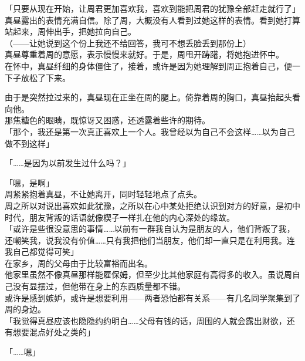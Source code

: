 「只要从现在开始，让周君更加喜欢我，喜欢到能把周君的犹豫全部赶走就行了」\\

真昼露出的表情充满自信。除了周，大概没有人看到过她这样的表情。看到她打算站起来，周伸出手，把她拉向自己。\\

（——让她说到这个份上我还不给回答，我可不想丢脸丢到那份上）\\

真昼尊重着周的意愿，表示慢慢来就好。于是，周甩开踌躇，将她抱进怀中。\\

在怀中，真昼纤细的身体僵住了，接着，或许是因为她理解到周正抱着自己，便一下子放松了下来。

由于是突然拉过来的，真昼现在正坐在周的腿上。倚靠着周的胸口，真昼抬起头看向他。\\

那焦糖色的眼睛，既惊讶又困惑，还透露着些许的期待。\\

「那个，我还是第一次真正喜欢上一个人。我曾经以为自己不会这样……以为自己做不到这样」

「……是因为以前发生过什么吗？」

「嗯，是啊」\\

周紧紧抱着真昼，不让她离开，同时轻轻地点了点头。\\

周之所以对说出喜欢如此犹豫，之所以在心中某处拒绝认识到对方的好意，是初中时代，朋友背叛的话语就像楔子一样扎在他的内心深处的缘故。\\

「或许是些很没意思的事情……以前有一群我自认为是朋友的人，他们背叛了我，还嘲笑我，说我没有价值……只有我把他们当朋友，他们却一直只是在利用我。连我自己都觉得可笑」\\

在家乡，周的父母由于比较富裕而出名。\\

他家里虽然不像真昼那样能雇保姆，但至少比其他家庭有高得多的收入。虽说周自己没有显摆过，但他带在身上的东西质量都不错。\\

或许是感到嫉妒，或许是想要利用——两者恐怕都有关系——有几名同学聚集到了周的身边。\\

「我觉得真昼应该也隐隐约约明白……父母有钱的话，周围的人就会露出财欲，还有想要混点好处之类的」

「……嗯」\\

